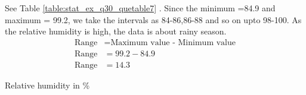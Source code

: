 See Table 	\ref{table:stat_ex_q30_quetable7}
.  Since the minimum =84.9 and maximum = 99.2, we take the intervals as 84-86,86-88 and so on upto 98-100. As the relative humidity is high, the data is about rainy season.\\
\begin{align}
\text{Range} &= \text{Maximum value - Minimum value}\\
\text{Range} &= 99.2 - 84.9\\
\text{Range} &= 14.3
\end{align}

	\begin{table}[ht]
	\begin{center}
    	
	\caption{Relative humidity in \%}
	\label{table:stat_ex_q30_quetable7}
	\end{center}
	\end{table}
